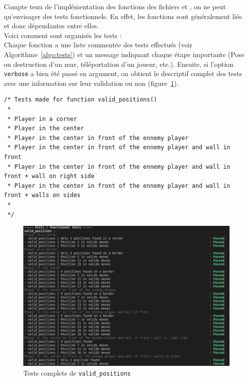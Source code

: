 \documentclass[a4paper]{article}
\begin{document}
Compte tenu de l'implémentation des fonctions des fichiers  et , on ne peut qu'envisager des tests fonctionnels. En effet, les fonctions sont généralement liés et donc dépendantes entre elles. \\

Voici comment sont organisés les tests : \\
Chaque fonction a une liste commentée des tests effectués (voir Algorithme~\ref{algo:tests}) et un message indiquant chaque étape importante (Pose ou destruction d'un mur, téléportation d'un joueur, etc.). Ensuite, si l'option \texttt{verbose}  a bien été passé en argument, on obtient le descriptif complet des tests avec une information sur leur validation ou non (figure~\ref{fig:tests_verbose}). \\

\begin{lstlisting}[caption = {Tests décris pour la fonction \texttt{valid\_positions()}}, label={algo:tests}]
/* Tests made for function valid_positions()
 *
 * Player in a corner
 * Player in the center
 * Player in the center in front of the ennemy player
 * Player in the center in front of the ennemy player and wall in front
 * Player in the center in front of the ennemy player and wall in front + wall on right side
 * Player in the center in front of the ennemy player and wall in front + walls on sides
 *
 */
\end{lstlisting}

\begin{figure}[ht]
    \centering
    \includegraphics[scale=0.5]{tests_valid.png}
    \caption{Tests complets de \texttt{valid\_positions}}
    \label{fig:tests_verbose}
\end{figure}
\end{document}
